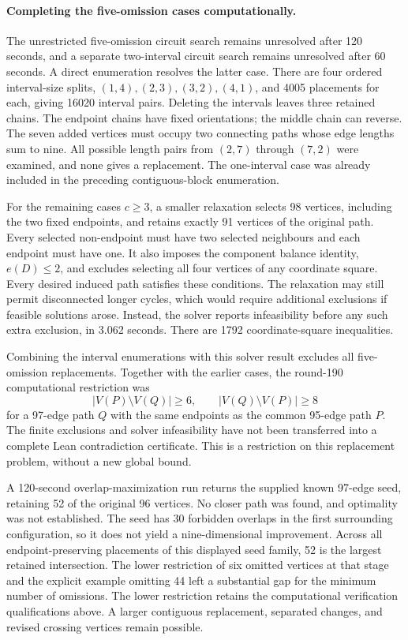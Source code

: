 \documentclass[11pt,a4paper]{article}
\theoremstyle{definition}
\theoremstyle{remark}
\begin{document}
\paragraph{Completing the five-omission cases computationally.}
The unrestricted five-omission circuit search remains unresolved after
120 seconds, and a separate two-interval circuit search remains unresolved
after 60 seconds. A direct enumeration resolves the latter case.
There are four ordered interval-size splits, $(1,4),(2,3),(3,2),(4,1)$,
and 4005 placements for each, giving 16020 interval pairs.
Deleting the intervals leaves three retained chains. The endpoint
chains have fixed orientations; the middle chain can reverse.
The seven added vertices must occupy two connecting paths whose edge
lengths sum to nine. All possible length pairs from $(2,7)$ through
$(7,2)$ were examined, and none gives a replacement. The one-interval
case was already included in the preceding contiguous-block enumeration.

For the remaining cases $c\ge3$, a smaller relaxation selects 98 vertices,
including the two fixed endpoints, and retains exactly 91 vertices of
the original path. Every selected non-endpoint must have two selected
neighbours and each endpoint must have one. It also imposes the component
balance identity, $e(D)\le2$, and excludes selecting all four vertices
of any coordinate square. Every desired induced path satisfies these
conditions. The relaxation may still permit disconnected longer cycles,
which would require additional exclusions if feasible solutions arose.
Instead, the solver reports infeasibility before any such extra exclusion,
in 3.062 seconds. There are 1792 coordinate-square inequalities.

Combining the interval enumerations with this solver result excludes all
five-omission replacements. Together with the earlier cases, the round-190
computational restriction was
\[
\boxed{|V(P)\setminus V(Q)|\ge6,\qquad
|V(Q)\setminus V(P)|\ge8}
\]
for a 97-edge path $Q$ with the same endpoints as the common 95-edge path
$P$. The finite exclusions and solver infeasibility have not been
transferred into a complete Lean contradiction certificate. This is a
restriction on this replacement problem, without a new global bound.

A 120-second overlap-maximization run returns the supplied known
97-edge seed, retaining 52 of the original 96 vertices. No closer path
was found, and optimality was not established. The seed has 30 forbidden
overlaps in the first surrounding configuration, so it does not yield
a nine-dimensional improvement. Across all endpoint-preserving placements
of this displayed seed family, 52 is the largest retained intersection.
The lower restriction of six omitted vertices at that stage and the
explicit example omitting 44 left a substantial gap for the minimum
number of omissions. The lower restriction retains the computational
verification qualifications above. A larger contiguous replacement,
separated changes, and revised crossing vertices remain possible.
\end{document}
